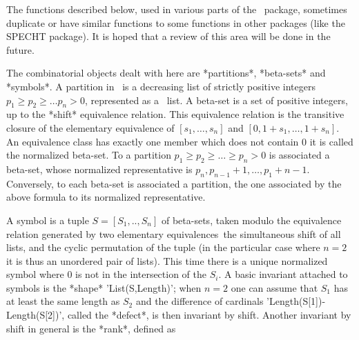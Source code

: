 

The functions  described below,  used in various  parts of  the \CHEVIE\
package, sometimes duplicate or have similar functions to some functions
in other packages (like the SPECHT  package). It is hoped that a review
of this area will be done in the future.

The combinatorial objects dealt with here are *partitions*, *beta-sets* and
*symbols*.  A  partition  in  \CHEVIE\  is  a  decreasing  list of strictly
positive  integers  $p_1\ge  p_2\ge  \ldots  p_n>0$, represented as a \GAP\
list.  A  beta-set  is  a  set  of  positive  integers,  up  to the *shift*
equivalence  relation. This equivalence relation  is the transitive closure
of the elementary equivalence of $[s_1,\ldots,s_n]$ and
$[0,1+s_1,\ldots,1+s_n]$. An equivalence class has exactly one member which
does not contain $0$\: it is called the normalized beta-set. To a partition
$p_1\ge  p_2\ge\ldots\ge p_n>0$ is associated  a beta-set, whose normalized
representative   is  $p_n,p_{n-1}+1,\ldots,p_1+n-1$.  Conversely,  to  each
beta-set is associated a partition, the one associated by the above formula
to its normalized representative.

A  symbol  is  a  tuple  $S=[S_1,..,S_n]$  of  beta-sets,  taken modulo the
equivalence  relation  generated  by  two  elementary  equivalences\:\  the
simultaneous  shift of all  lists, and the  cyclic permutation of the tuple
(in the particular case where $n=2$ it is thus an unordered pair of lists).
This  time  there  is  a  unique  normalized  symbol  where 0 is not in the
intersection  of the  $S_i$. A  basic invariant  attached to symbols is the
*shape* 'List(S,Length)'; when $n=2$ one can assume that $S_1$ has at least
the same length as $S_2$ and the difference of cardinals
'Length(S[1])-Length(S[2])',  called  the  *defect*,  is  then invariant by
shift. Another invariant by shift in general is the *rank*, defined as

